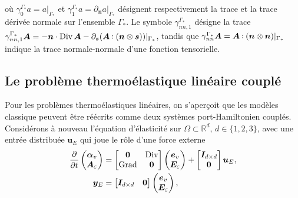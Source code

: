 où $ \gamma_{0}^{\Gamma_*} a = a \vert_{\Gamma_*} $ et $ \gamma_{1}^{\Gamma_*} a = \partial_{\bm{n}} a \vert_{\Gamma_*} $ désignent respectivement la trace et la trace dérivée normale sur l'ensemble $\Gamma_*$. Le symbole $\gamma_{nn, 1}^{\Gamma_*}$ désigne la trace $\gamma_{nn, 1}^{\Gamma_*} \bm{A} = -\bm{n} \cdot \Div \bm{A} - \partial_{\bm{s}} (\bm{A} \cddot (\bm{n} \otimes \bm{s})) \vert_{\Gamma_*}$, tandis que $\gamma_{nn}^{\Gamma_*} \bm{A} = \bm{A} \cddot (\bm{n} \otimes \bm{n}) \vert_{\Gamma_*} $ indique la  trace normale-normale d'une fonction tensorielle. 

\subsection*{Le problème thermoélastique linéaire couplé}
Pour les problèmes thermoélastiques linéaires, on s'aperçoit que les modèles classique peuvent être réécrits comme deux systèmes port-Hamiltonien couplés. Considérons à nouveau l'équation d'élasticité sur $\Omega \subset \mathbb{R}^d, \, d \in \{1, 2, 3 \} $, avec une entrée distribuée $\bm{u}_E$ qui joue le rôle d'une force externe
\begin{equation*}
\begin{aligned}
\diffp{}{t}
\begin{pmatrix}
\bm{\alpha}_v \\
\bm{A}_{\varepsilon} \\
\end{pmatrix} &= 
\begin{bmatrix}
\bm{0} & \Div \\
\Grad & \bm{0} \\
\end{bmatrix}
\begin{pmatrix}
\bm{e}_v \\
\bm{E}_{\varepsilon} \\
\end{pmatrix} + 
\begin{bmatrix}
\bm{I}_{d\times d} \\
\bm{0} \\
\end{bmatrix}\bm{u}_E, \\
\bm{y}_E &= \begin{bmatrix}
\bm{I}_{d\times d} & \bm{0} \\
\end{bmatrix}
\begin{pmatrix}
\bm{e}_v \\
\bm{E}_{\varepsilon}
\end{pmatrix},
\end{aligned}
\end{equation*}
